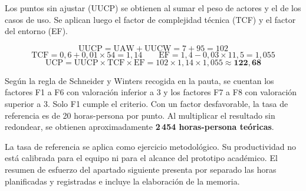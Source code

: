 Los puntos sin ajustar (UUCP) se obtienen al sumar el peso de actores
y el de los casos de uso. Se aplican luego el factor de complejidad
técnica (TCF) y el factor del entorno (EF).

\[
    \mathrm{UUCP} = \mathrm{UAW} + \mathrm{UUCW} = 7 + 95 = 102
\]
\[
    \mathrm{TCF} = 0{,}6 + 0{,}01 \times 54 = 1{,}14
    \qquad
    \mathrm{EF} = 1{,}4 - 0{,}03 \times 11{,}5 = 1{,}055
\]
\[
    \mathrm{UCP} = \mathrm{UUCP} \times \mathrm{TCF} \times \mathrm{EF}
    = 102 \times 1{,}14 \times 1{,}055 \approx \mathbf{122{,}68}
\]

Según la regla de Schneider y Winters recogida en la pauta, se cuentan
los factores F1 a F6 con valoración inferior a 3 y los factores F7 a F8
con valoración superior a 3. Solo F1 cumple el criterio. Con un factor
desfavorable, la tasa de referencia es de 20 horas-persona por punto.
Al multiplicar el resultado sin redondear, se obtienen aproximadamente
\textbf{2\,454 horas-persona teóricas}.

La tasa de referencia se aplica como ejercicio metodológico. Su
productividad no está calibrada para el equipo ni para el alcance del
prototipo académico. El resumen de esfuerzo del apartado siguiente
presenta por separado las horas planificadas y registradas e incluye
la elaboración de la memoria.

